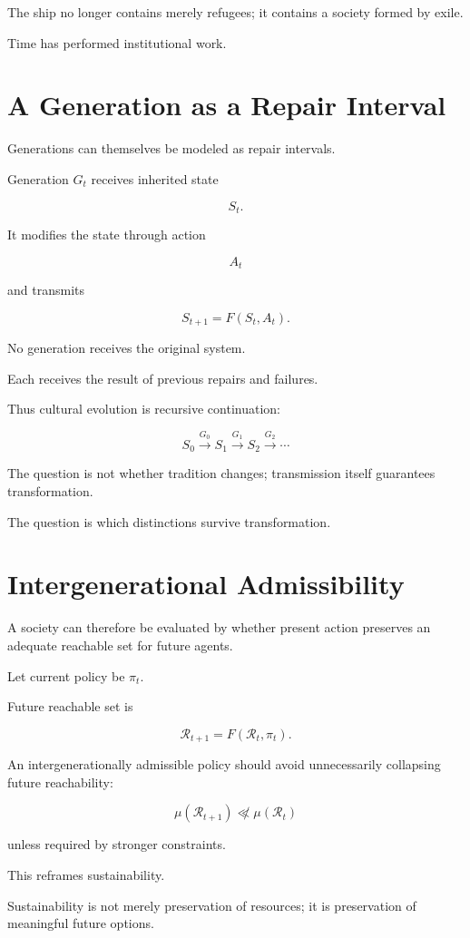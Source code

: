 \documentclass[11pt,oneside]{book}
\theoremstyle{definition}
\theoremstyle{remark}
\newcommand{\R}{\mathcal{R}}
\begin{document}
The ship no longer contains merely refugees; it contains a society formed by exile.

Time has performed institutional work.

\section{A Generation as a Repair Interval}

Generations can themselves be modeled as repair intervals.

Generation \(G_t\) receives inherited state

\[
S_t.
\]

It modifies the state through action

\[
A_t
\]

and transmits

\[
S_{t+1}
=
F(S_t,A_t).
\]

No generation receives the original system.

Each receives the result of previous repairs and failures.

Thus cultural evolution is recursive continuation:

\[
S_0
\xrightarrow{G_0}
S_1
\xrightarrow{G_1}
S_2
\xrightarrow{G_2}
\cdots
\]

The question is not whether tradition changes; transmission itself guarantees transformation.

The question is which distinctions survive transformation.

\section{Intergenerational Admissibility}

A society can therefore be evaluated by whether present action preserves an adequate reachable set for future agents.

Let current policy be \(\pi_t\).

Future reachable set is

\[
\R_{t+1}
=
F(\R_t,\pi_t).
\]

An intergenerationally admissible policy should avoid unnecessarily collapsing future reachability:

\[
\mu(\R_{t+1})
\not\ll
\mu(\R_t)
\]

unless required by stronger constraints.

This reframes sustainability.

Sustainability is not merely preservation of resources; it is preservation of meaningful future options.
\end{document}
